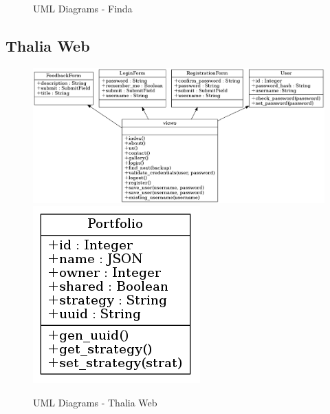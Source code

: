 \documentclass[main.tex]{subfiles}
\begin{document}
\begin{figure}[H]
   \caption{UML Diagrams - Finda}
\end{figure}

\subsection{Thalia Web}

\begin{figure}[H]
   \centering
   \includegraphics[width=\textwidth,keepaspectratio]{Report/08Appendices/084UML/084Pictures/classes_thalia_1.png}
   \includegraphics[scale=2.0,keepaspectratio]{Report/08Appendices/084UML/084Pictures/classes_thalia_2.png}
   \caption{UML Diagrams - Thalia Web}
\end{figure}
\end{document}
